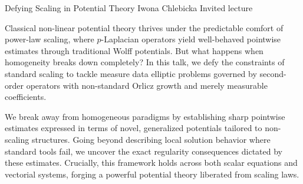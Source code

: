 \abstractheading
  {Defying Scaling in Potential Theory}
  {Iwona Chlebicka}
  {\affilUniversityWarsaw}
  {Invited lecture}

Classical non-linear potential theory thrives under the predictable comfort of
power-law scaling, where $p$-Laplacian operators yield well-behaved pointwise
estimates through traditional Wolff potentials. But what happens when homogeneity
breaks down completely? In this talk, we defy the constraints of standard scaling
to tackle measure data elliptic problems governed by second-order operators with
non-standard Orlicz growth and merely measurable coefficients.

We break away from homogeneous paradigms by establishing sharp pointwise
estimates expressed in terms of novel, generalized potentials tailored to
non-scaling structures. Going beyond describing local solution behavior where
standard tools fail, we uncover the exact regularity consequences dictated by
these estimates. Crucially, this framework holds across both scalar equations
and vectorial systems, forging a powerful potential theory liberated from
scaling laws.
